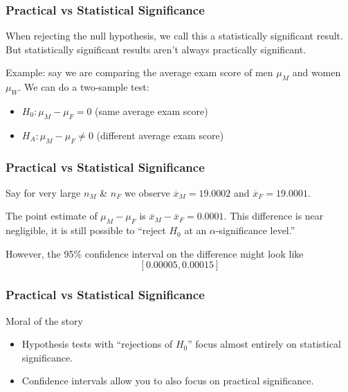 \documentclass[handout]{beamer}
\newcommand{\blue}[1]{\textcolor{blue2}{#1}}
\newcommand{\xbar}{\overline{x}}
\begin{document}
\begin{frame}
\frametitle{Practical vs Statistical Significance}
When rejecting the null hypothesis, we call this a \blue{statistically significant} result.  But statistically significant results aren't always \blue{practically significant}.

\pause\vspace{0.5cm}

Example: say we are comparing the average exam score of men $\mu_M$ and women $\mu_W$.  \pause We can do a two-sample test:

\begin{itemize}
\item $H_0: \mu_M - \mu_F = 0$ (same average exam score)
\item $H_A: \mu_M - \mu_F \neq 0$ (different average exam score)
\end{itemize}

\end{frame}


\begin{frame}
\frametitle{Practical vs Statistical Significance}
Say for \blue{very} large $n_M$ \& $n_F$ we observe $\xbar_M = 19.0002$ and $\xbar_F = 19.0001$.

\pause\vspace{0.5cm}

The point estimate of $\mu_M - \mu_F$ is $\xbar_M - \xbar_F = 0.0001$.  This difference is near negligible, it is still possible to ``reject $H_0$ at an $\alpha$-significance level.''  

\pause\vspace{0.5cm}

However, the 95\% confidence interval on the difference might look like
\[
[0.00005, 0.00015]
\]

\end{frame}


\begin{frame}
\frametitle{Practical vs Statistical Significance}

Moral of the story

\begin{itemize}
\pause\item Hypothesis tests with ``rejections of $H_0$'' focus almost entirely on \blue{statistical significance}.
\pause\item Confidence intervals allow you to also focus on \blue{practical significance}.  
\end{itemize}

\end{frame}
\end{document}
